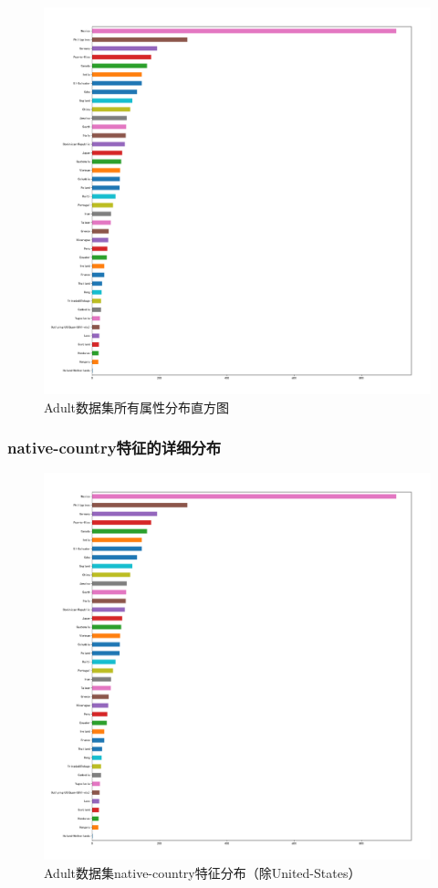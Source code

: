 \documentclass[12pt,a4paper]{article}
\theoremstyle{definition}
\begin{document}
\begin{appendix}
	\vspace{-0.02\linewidth}
	\begin{figure}[H]
		\centering
		\includegraphics[width=0.75\linewidth]{img/native_country_dis2.pdf}
		\caption{Adult数据集所有属性分布直方图}
		\label{fig:all_features}
	\end{figure}
	
	\subsubsection{native-country特征的详细分布}
	\label{apd:native-country}
	
	\vspace{-0.02\linewidth}
	\begin{figure}[H]
		\centering
		\includegraphics[width=0.75\linewidth]{img/native_country_dis2.pdf}
		\caption{Adult数据集native-country特征分布（除United-States）}
		\label{fig:class_feature_dis_detail}
	\end{figure}
	

\end{appendix}
\end{document}
